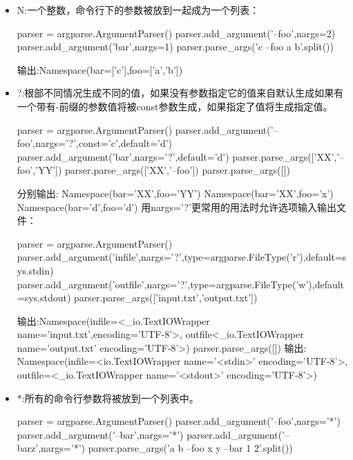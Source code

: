 \begin{itemize}
\item N:一个整数，命令行下的参数被放到一起成为一个列表：
\begin{python}
parser = argparse.ArgumentParser()
parser.add_argument('--foo',nargs=2)
parser.add_argument('bar',nargs=1)
parser.parse_args('c --foo a b'.split())
\end{python}
输出:Namespace(bar=['c'],foo=['a','b'])
\item ?:根部不同情况生成不同的值，如果没有参数指定它的值来自默认生成如果有一个带有-前缀的参数值将被const参数生成，如果指定了值将生成指定值。
\begin{python}
parser = argparse.ArgumentParser()
parser.add_argument('--foo',nargs='?',const='c',default='d')
parser.add_argument('bar',nargs='?',default='d')
parser.parse_args(['XX','--foo','YY'])
parser.parse_args(['XX','--foo'])
parser.parse_args([])
\end{python}
分别输出:\newline
Namespace(bar='XX',foo='YY')\newline
Namespace(bar='XX',foo='x')\newline
Namespace(bar='d',foo='d')\newline
用nargs='?'更常用的用法时允许选项输入输出文件：
\begin{python}
parser = argparse.ArgumentParser()
parser.add_argument('infile',nargs='?',type=argparse.FileType('r'),default=sys.stdin)
parser.add_argument('outfile',nargs='?',type=argparse.FileType('w'),default=sys.stdout)
parser.parse_args(['input.txt','output.txt'])
\end{python}
输出:Namespace(infile=<\_io.TextIOWrapper name='input.txt',encoding='UTF-8'>,
outfile<\_io.TextIOWrapper name='output.txt' encoding='UTF-8'>)
parser.parse\_args([])
输出:
Namespace(infile=<io.TextIOWrapper name='<stdin>' encoding='UTF-8'>,
outfile=<\_io.TextIOWrapper name='<stdout>' encoding='UTF-8'>)
\item *:所有的命令行参数将被放到一个列表中。
\begin{python}
parser = argparse.ArgumentParser()
parser.add_argument('--foo',nargs='*')
parser.add_argument('--bar',nargs='*')
parser.add_argument('--barz',nargs='*')
parser.parse_args('a b --foo x y --bar 1 2'.split())


\end{python}
\end{itemize}

